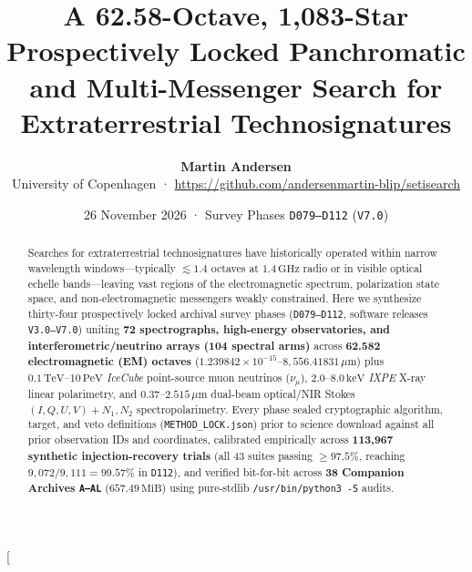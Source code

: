 \documentclass[twocolumn,10pt]{article}
\title{\vspace{-0.8em}\textbf{\Large A 62.58-Octave, 1,083-Star Prospectively Locked Panchromatic and Multi-Messenger Search for Extraterrestrial Technosignatures}}
\author{\textbf{Martin Andersen}\\[0.25em]
\small University of Copenhagen · \href{https://github.com/andersenmartin-blip/setisearch}{https://github.com/andersenmartin-blip/setisearch}}
\date{\small 26 November 2026 · Survey Phases \texttt{D079--D112} (\texttt{V7.0})}
\begin{document}
\twocolumn[{
\begin{@twocolumnfalse}
\maketitle
\vspace{-0.9em}
\begin{abstract}
\noindent Searches for extraterrestrial technosignatures have historically operated within narrow wavelength windows---typically $\lesssim 1.4$ octaves at $1.4\,\mathrm{GHz}$ radio or in visible optical echelle bands---leaving vast regions of the electromagnetic spectrum, polarization state space, and non-electromagnetic messengers weakly constrained. Here we synthesize thirty-four prospectively locked archival survey phases (\texttt{D079--D112}, software releases \texttt{V3.0--V7.0}) uniting \textbf{72 spectrographs, high-energy observatories, and interferometric/neutrino arrays (104 spectral arms)} across \textbf{62.582 electromagnetic (EM) octaves} ($1.239842\times 10^{-15}\text{--}8{,}556.41831\,\mu\text{m}$) plus $0.1\,\mathrm{TeV}\text{--}10\,\mathrm{PeV}$ \textit{IceCube} point-source muon neutrinos ($\nu_\mu$), $2.0\text{--}8.0\,\mathrm{keV}$ \textit{IXPE} X-ray linear polarimetry, and $0.37\text{--}2.515\,\mu\text{m}$ dual-beam optical/NIR Stokes $(I,Q,U,V)+N_1,N_2$ spectropolarimetry. Every phase sealed cryptographic algorithm, target, and veto definitions (\texttt{METHOD\_LOCK.json}) prior to science download against all prior observation IDs and coordinates, calibrated empirically across \textbf{113,967 synthetic injection-recovery trials} (all 43 suites passing $\ge 97.5\%$, reaching $9{,}072/9{,}111 = 99.57\%$ in \texttt{D112}), and verified bit-for-bit across \textbf{38 Companion Archives \texttt{A--AL}} ($657.49\,\mathrm{MiB}$) using pure-stdlib \texttt{/usr/bin/python3 -S} audits.\par\smallskip

\end{abstract}
\end{@twocolumnfalse}}
\end{document}
